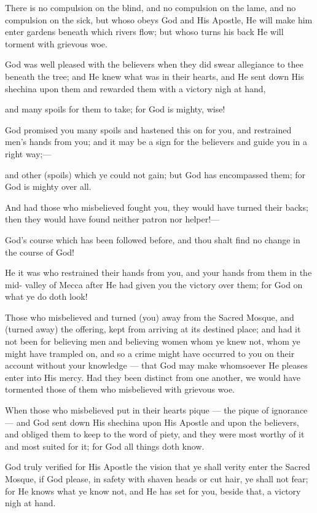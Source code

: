 \documentclass[fontsize=14pt, letterpaper, notitlepage, openany, DIV=12]{scrbook} %
\begin{document}
\noindent[48:17]
There is no compulsion on the blind, and no compulsion on the lame, and no compulsion
on the sick, but whoso obeys God and His Apostle, He will make him enter gardens beneath
which rivers flow; but whoso turns his back He will torment with grievous woe.

\noindent[48:18]
God was well pleased with the believers when they did swear allegiance to thee beneath
the tree; and He knew what was in their hearts, and He sent down His shechina upon them and
rewarded them with a victory nigh at hand,

\noindent[48:19]
and many spoils for them to take; for God is mighty, wise!

\noindent[48:20]
God promised you many spoils and hastened this on for you, and restrained men's hands
from you; and it may be a sign for the believers and guide you in a right way;---

\noindent[48:21]
and other (spoils) which ye could not gain; but God has encompassed them; for God is
mighty over all.

\noindent[48:22]
And had those who misbelieved fought you, they would have turned their backs; then
they would have found neither patron nor helper!---

\noindent[48:23]
God's course which has been followed before, and thou shalt find no change in the course
of God!

\noindent[48:24]
He it was who restrained their hands from you, and your hands from them in the mid-
valley of Mecca after He had given you the victory over them; for God on what ye do doth look!

\noindent[48:25]
Those who misbelieved and turned (you) away from the Sacred Mosque, and (turned
away) the offering, kept from arriving at its destined place; and had it not been for believing men
and believing women whom ye knew not, whom ye might have trampled on, and so a crime
might have occurred to you on their account without your knowledge --- that God may make
whomsoever He pleases enter into His mercy. Had they been distinct from one another, we
would have tormented those of them who misbelieved with grievous woe.

\noindent[48:26]
When those who misbelieved put in their hearts pique --- the pique of ignorance --- and
God sent down His shechina upon His Apostle and upon the believers, and obliged them to keep
to the word of piety, and they were most worthy of it and most suited for it; for God all things
doth know.

\noindent[48:27]
God truly verified for His Apostle the vision that ye shall verity enter the Sacred Mosque,
if God please, in safety with shaven heads or cut hair, ye shall not fear; for He knows what ye
know not, and He has set for you, beside that, a victory nigh at hand.
\end{document}
